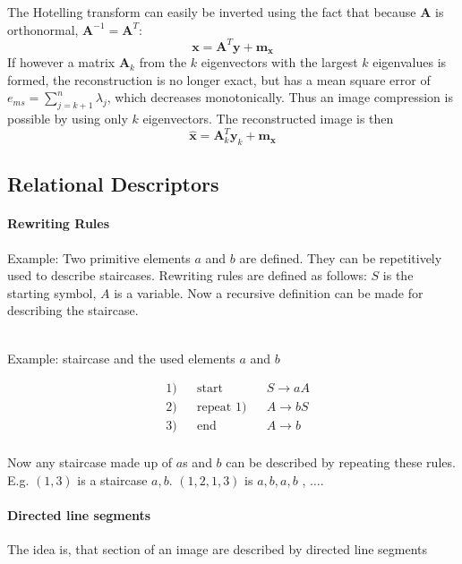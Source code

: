The Hotelling transform can easily be inverted using the fact that because $\mathbf{A}$ is orthonormal, $\mathbf{A}^{-1} = \mathbf{A}^T$:
	\[
		\mathbf{x} = \mathbf{A}^T \mathbf{y} + \mathbf{m_x}
	\]
If however a matrix $\mathbf{A}_k$ from the $k$ eigenvectors with the largest $k$ eigenvalues is formed, the reconstruction is no longer exact, but has a mean square error of $e_{ms} = \sum\limits_{j=k+1}^{n} \lambda_j$, which decreases monotonically. 
Thus an image compression is possible by using only $k$ eigenvectors. The reconstructed image is then
	\[
		\hat{\mathbf{x}} = \mathbf{A}_k^T \mathbf{y}_k + \mathbf{m_x}
	\]

\subsection{Relational Descriptors}

\paragraph{Rewriting Rules}
Example: 
Two primitive elements $a$ and $b$ are defined. They can be repetitively used to describe staircases.
Rewriting rules are defined as follows: $S$ is the starting symbol, $A$ is a variable.
Now a recursive definition can be made for describing the staircase.

\begin{multicols}{2}
\begin{center}
	 \\
	Example: staircase and the used elements $a$ and $b$
\end{center}
\vfill
\columnbreak
\begin{align*}
& 1) && \text{start} && S \rightarrow aA\\
& 2) && \text{repeat 1)} &&  A \rightarrow bS \\
& 3) && \text{end} &&  A \rightarrow b \\
\end{align*}
\end{multicols}
Now any staircase made up of $a$s and $b$ can be described by repeating these rules. 
E.g. $(1,3)$ is a staircase $a,b$. $(1,2,1,3)$ is $a,b,a,b$ , $\ldots$. \\

\paragraph{Directed line segments} The idea is, that section of an image are described by directed line segments

